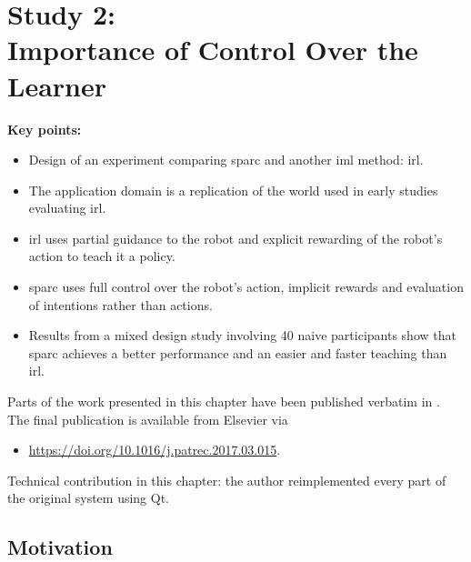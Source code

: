 \chapter[Study 2: Importance of Control Over the Learner]{Study 2: \\ Importance of Control Over the Learner}\label{chap:control}
\glsresetall
\graphicspath{{images/control/}}

\newcommand{\nosemic}{\SetEndCharOfAlgoLine{\relax}}%
\newcommand{\dosemic}{\SetEndCharOfAlgoLine{\string;}}%
\newcommand{\pushline}{\Indp}%
\newcommand{\popline}{\Indm\dosemic}%

\begin{framed}
	\textbf{Key points:}
	
	\begin{itemize}
		\item Design of an experiment comparing \acrshort{sparc} and another \acrshort{iml} method: \acrshort{irl}.
		\item The application domain is a replication of the world used in early studies evaluating \acrshort{irl}.
		\item \acrshort{irl} uses partial guidance to the robot and explicit rewarding of the robot's action to teach it a policy.
		\item \acrshort{sparc} uses full control over the robot's action, implicit rewards and evaluation of intentions rather than actions.
		\item Results from a mixed design study involving 40 naive participants show that \acrshort{sparc} achieves a better performance and an easier and faster teaching than \acrshort{irl}.
	\end{itemize}
\end{framed}

Parts of the work presented in this chapter have been published verbatim in \cite{senft2017supervised}. The final publication is available from Elsevier via
\begin{itemize}
	\item \url{https://doi.org/10.1016/j.patrec.2017.03.015}.
\end{itemize} 

Technical contribution in this chapter: the author reimplemented every part of the original system using Qt.

\newpage
\section{Motivation}

